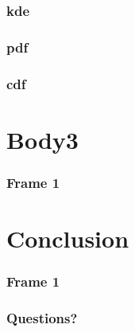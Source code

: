 \documentclass{beamer}
\begin{document}
\begin{frame}[fragile]
\begin{columns}
\begin{column}{0.7\textwidth}
\end{column}
\end{columns}

\end{frame}

\begin{frame}
\frametitle{kde}
\end{frame}

\begin{frame}
\frametitle{pdf}
\end{frame}

\begin{frame}
\frametitle{cdf}
\end{frame}

\section{Body3}
\begin{frame}
\frametitle{Frame 1}
\end{frame}
\section{Conclusion}
\begin{frame}
\frametitle{Frame 1}
\end{frame}

\begin{frame}
\frametitle{Questions?}
\end{frame}
\end{document}
